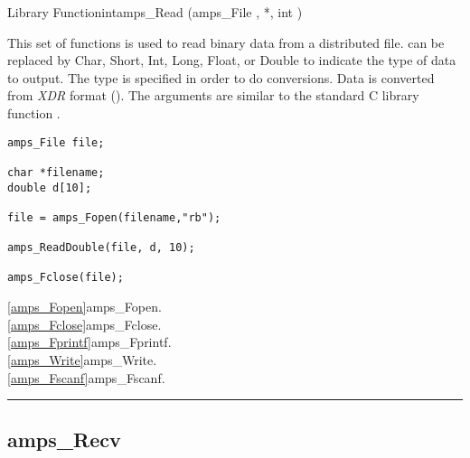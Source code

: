 \begin{deftypefn}{Library Function}{int}{amps\_Read}
(amps_File ,  *, int ) 

\DESCRIPTION

This set of functions is used to read binary data from a distributed file.
  can be replaced by Char, Short, Int, Long, Float, or Double
to indicate the type of data to output.  The type is specified in order
to do conversions.  Data is converted from {\em XDR} format (\cite{xdr.87}).
The arguments are similar to the standard C library function
.

\EXAMPLE
\begin{display}\begin{verbatim}
amps_File file;

char *filename;
double d[10];

file = amps_Fopen(filename,"rb");

amps_ReadDouble(file, d, 10);

amps_Fclose(file);
\end{verbatim}\end{display}

\SEEALSO
\vref{amps_Fopen}{amps\_Fopen}. \\
\vref{amps_Fclose}{amps\_Fclose}. \\
\vref{amps_Fprintf}{amps\_Fprintf}. \\
\vref{amps_Write}{amps\_Write}. \\
\vref{amps_Fscanf}{amps\_Fscanf}. \\

\end{deftypefn}



\noindent\rule{\textwidth}{1mm}

\subsection{amps\_Recv}
\label{amps_Recv}


